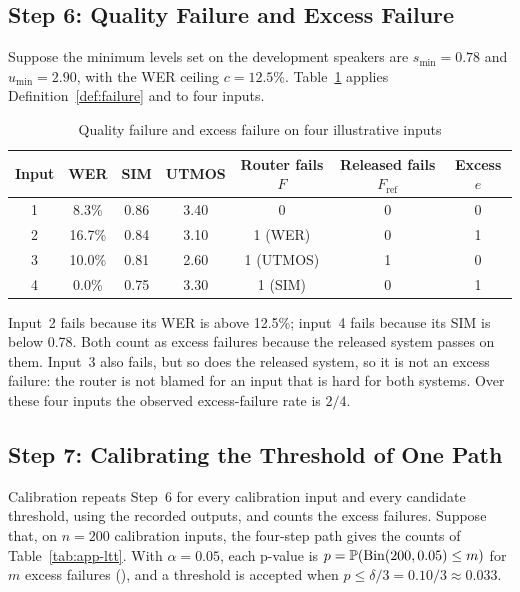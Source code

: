 \subsection{Step 6: Quality Failure and Excess Failure}
\label{app:calc-fail}

Suppose the minimum levels set on the development speakers are $s_{\min}=0.78$ and $u_{\min}=2.90$, with the WER ceiling $c=12.5\%$. Table~\ref{tab:app-fail} applies Definition~\ref{def:failure} and  to four inputs.

\begin{table}[!htbp]
\centering\small
\caption{Quality failure and excess failure on four illustrative inputs}
\label{tab:app-fail}
\begin{tabular}{@{}c c c c c c c@{}}
\toprule
\textbf{Input} & \textbf{WER} & \textbf{SIM} & \textbf{UTMOS} & \textbf{Router fails $F$} & \textbf{Released fails $F_{\text{ref}}$} & \textbf{Excess $e$} \\
\midrule
1 & 8.3\% & 0.86 & 3.40 & 0 & 0 & 0 \\
2 & 16.7\% & 0.84 & 3.10 & 1 (WER) & 0 & 1 \\
3 & 10.0\% & 0.81 & 2.60 & 1 (UTMOS) & 1 & 0 \\
4 & 0.0\% & 0.75 & 3.30 & 1 (SIM) & 0 & 1 \\
\bottomrule
\end{tabular}
\end{table}

Input~2 fails because its WER is above 12.5\%; input~4 fails because its SIM is below 0.78. Both count as excess failures because the released system passes on them. Input~3 also fails, but so does the released system, so it is not an excess failure: the router is not blamed for an input that is hard for both systems. Over these four inputs the observed excess-failure rate is $2/4$.

\subsection{Step 7: Calibrating the Threshold of One Path}
\label{app:calc-ltt}

Calibration repeats Step~6 for every calibration input and every candidate threshold, using the recorded outputs, and counts the excess failures. Suppose that, on $n=200$ calibration inputs, the four-step path gives the counts of Table~\ref{tab:app-ltt}. With $\alpha=0.05$, each p-value is $p=\P(\mathrm{Bin}(200,0.05)\le m)$ for $m$ excess failures (), and a threshold is accepted when $p\le\delta/3=0.10/3\approx0.033$.


